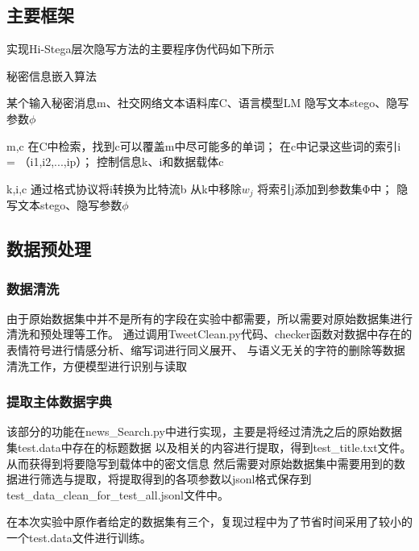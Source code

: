 \documentclass[a4paper,11pt,UTF8]{ctexart}
\begin{document}
  \subsection{主要框架}
        实现Hi-Stega层次隐写方法的主要程序伪代码如下所示
        \begin{algorithm}
            \caption{秘密信息嵌入算法}
            \begin{algorithmic}[1]  %
                \Require 某个输入秘密消息m、社交网络文本语料库C、语言模型LM
                \Ensure 隐写文本stego、隐写参数$\phi $

                 {m,c}
                    \State 在C中检索，找到c可以覆盖m中尽可能多的单词；
                    \State 在c中记录这些词的索引i = （i1,i2,...,ip）；
                    \EndIf 
                    \State \Return 控制信息k、i和数据载体c
                \EndFunction

                 {k,i,c}
                    \State 通过格式协议将i转换为比特流b
                            \State 从k中移除$w_{j}$
                            \State 将索引j添加到参数集Φ中；
                        \EndIf
                     \EndWhile
                    \State \Return 隐写文本stego、隐写参数$\phi $

                \EndFunction
            \end{algorithmic}
        \end{algorithm}

    \subsection{数据预处理}
      \subsubsection{数据清洗}
        由于原始数据集中并不是所有的字段在实验中都需要，所以需要对原始数据集进行清洗和预处理等工作。
        通过调用TweetClean.py代码、checker函数对数据中存在的表情符号进行情感分析、缩写词进行同义展开、
        与语义无关的字符的删除等数据清洗工作，方便模型进行识别与读取

      \subsubsection{提取主体数据字典}
        该部分的功能在news\_Search.py中进行实现，主要是将经过清洗之后的原始数据集test.data中存在的标题数据
        以及相关的内容进行提取，得到test\_title.txt文件。从而获得到将要隐写到载体中的密文信息
        然后需要对原始数据集中需要用到的数据进行筛选与提取，将提取得到的各项参数以jsonl格式保存到\\
        test\_data\_clean\_for\_test\_all.jsonl文件中。\par
        在本次实验中原作者给定的数据集有三个，复现过程中为了节省时间采用了较小的一个test.data文件进行训练。
\end{document}
